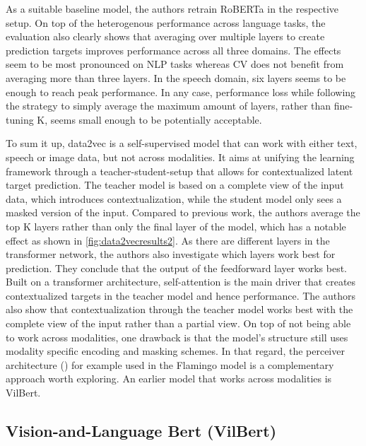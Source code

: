 \documentclass[
]{krantz}
\begin{document}
As a suitable baseline model, the authors retrain RoBERTa in the respective setup. On top of the heterogenous performance across language tasks, the evaluation also clearly shows that averaging over multiple layers to create prediction targets improves performance across all three domains. The effects seem to be most pronounced on NLP tasks whereas CV does not benefit from averaging more than three layers. In the speech domain, six layers seems to be enough to reach peak performance.
In any case, performance loss while following the strategy to simply average the maximum amount of layers, rather than fine-tuning K, seems small enough to be potentially acceptable.

To sum it up, data2vec is a self-supervised model that can work with either text, speech or image data, but not across modalities. It aims at unifying the learning framework through a teacher-student-setup that allows for contextualized latent target prediction. The teacher model is based on a complete view of the input data, which introduces contextualization, while the student model only sees a masked version of the input. Compared to previous work, the authors average the top K layers rather than only the final layer of the model, which has a notable effect as shown in \ref{fig:data2vecresults2}. As there are different layers in the transformer network, the authors also investigate which layers work best for prediction. They conclude that the output of the feedforward layer works best. Built on a transformer architecture, self-attention
is the main driver that creates contextualized targets in the teacher model and hence performance.
The authors also show that contextualization through the teacher model works best with the complete view of the input rather than a partial view. On top of not being able to work across modalities, one drawback is that the model's structure still uses modality specific encoding and masking schemes. In that regard, the perceiver architecture (\citet{jaegle2021perceiver}) for example used in the Flamingo model is a complementary approach worth exploring. An earlier model that works across modalities is VilBert.

\hypertarget{vision-and-language-bert-vilbert}{%
\subsection{Vision-and-Language Bert (VilBert)}\label{vision-and-language-bert-vilbert}}
\end{document}
